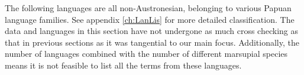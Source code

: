 The following languages are all non-Austronesian,
belonging to various Papuan language families.
See appendix \ref{ch:LanLis} for more detailed classification.
The data and languages in this section have not undergone as much
cross checking as that in previous sections as it was tangential
to our main focus.
Additionally, the number of languages combined with the number
of different marsupial species means it is not feasible to list
all the terms from these languages.